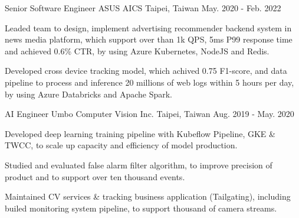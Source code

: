 

\begin{cventries}

  \cventry
    {Senior Software Engineer} %
    {ASUS AICS} %
    {Taipei, Taiwan} %
    {May. 2020 - Feb. 2022} %
    {
      \begin{cvitems} %
        \item {Leaded team to design, implement advertising recommender backend system in news media platform, which support over than 1k QPS, 5ms P99 response time and achieved 0.6\% CTR, by using Azure Kubernetes, NodeJS and Redis.}
        \item {Developed cross device tracking model, which achived 0.75 F1-score, and data pipeline to process and inference 20 millions of web logs within 5 hours per day, by using Azure Databricks and Apache Spark.}
      \end{cvitems}
    }

  \cventry
    {AI Engineer} %
    {Umbo Computer Vision Inc.} %
    {Taipei, Taiwan} %
    {Aug. 2019 - May. 2020} %
    {
      \begin{cvitems} %
        \item {Developed deep learning training pipeline with Kubeflow Pipeline, GKE \& TWCC, to scale up capacity and efficiency of model production.}
        \item {Studied and evaluated false alarm filter algorithm, to improve precision of product and to support over ten thousand events.}
        \item {Maintained CV services \& tracking business application (Tailgating), including builed monitoring system pipeline, to support thousand of camera streams.}
      \end{cvitems}
    }


\end{cventries}
